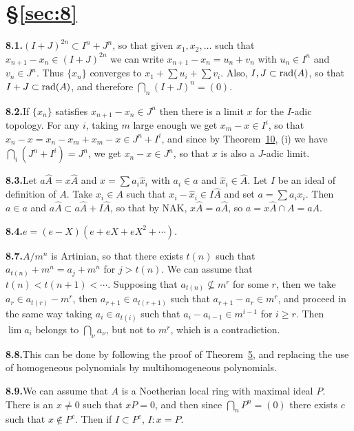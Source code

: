 \section*{\S\ref{sec:8}}

\noindent\textbf{8.1.}\quad $(I+J)^{2n} \subset I^n + J^n$, so that given $x_1, x_2, \ldots$ such that $x_{n+1} - x_n \in (I+J)^{2n}$
we can write $x_{n+1} - x_n = u_n + v_n$ with $u_n \in I^n$ and $v_n \in J^n$. Thus $\{x_n\}$
converges to $x_1 + \sum u_i + \sum v_i$. Also, $I, J \subset \operatorname{rad}(A)$, so that $I + J \subset \operatorname{rad}(A)$, and
therefore $\bigcap_n (I + J)^n = (0)$.

\noindent\textbf{8.2.}\quad If $\{x_n\}$ satisfies $x_{n+1} - x_n \in J^n$ then there is a limit $x$ for the $I$-adic topology.
For any $i$, taking $m$ large enough we get $x_m - x \in I^i$, so that $x_n - x = x_n - x_m + x_m - x
\in J^n + I^i$, and since by Theorem~\hyperref[thm:8.10]{10}, (i) we have $\bigcap_i (J^n + I^i) = J^n$, we get
$x_n - x \in J^n$, so that $x$ is also a $J$-adic limit.

\noindent\textbf{8.3.}\quad Let $a\hat{A} = x\hat{A}$ and $x = \sum a_i\hat{x}_i$ with $a_i \in a$ and $\hat{x}_i \in \hat{A}$. Let $I$ be an ideal of
definition of $A$. Take $x_i \in A$ such that $x_i - \hat{x}_i \in I\hat{A}$ and set $a = \sum a_ix_i$. Then
$a \in a$ and $a\hat{A} \subset a\hat{A} + I\hat{A}$, so that by NAK, $x\hat{A} = a\hat{A}$, so $a = x\hat{A} \cap A = aA$.

\noindent\textbf{8.4.}\quad $e = (e - X)(e + eX + eX^2 + \cdots)$.

\noindent\textbf{8.7.}\quad $A/m^n$ is Artinian, so that there exists $t(n)$ such that $a_{t(n)} + m^n = a_j + m^n$ for
$j > t(n)$. We can assume that $t(n) < t(n+1) < \cdots$. Supposing that $a_{t(n)} \nsubseteq m^r$ for some
$r$, then we take $a_r \in a_{t(r)} - m^r$, then $a_{r+1} \in a_{t(r+1)}$ such that $a_{r+1} - a_r \in m^r$, and
proceed in the same way taking $a_i \in a_{t(i)}$ such that $a_i - a_{i-1} \in m^{i-1}$ for $i \ge r$. Then
$\lim a_i$ belongs to $\bigcap_\nu a_\nu$, but not to $m^r$, which is a contradiction.

\noindent\textbf{8.8.}\quad This can be done by following the proof of Theorem~\hyperref[thm:8.5]{5}, and replacing the
use of homogeneous polynomials by multihomogeneous polynomials.

\noindent\textbf{8.9.}\quad We can assume that $A$ is a Noetherian local ring with maximal ideal $P$.
There is an $x \neq 0$ such that $xP = 0$, and then since $\bigcap_n P^n = (0)$ there exists $c$
such that $x \notin P^c$. Then if $I \subset P^c$, $I:x = P$.

